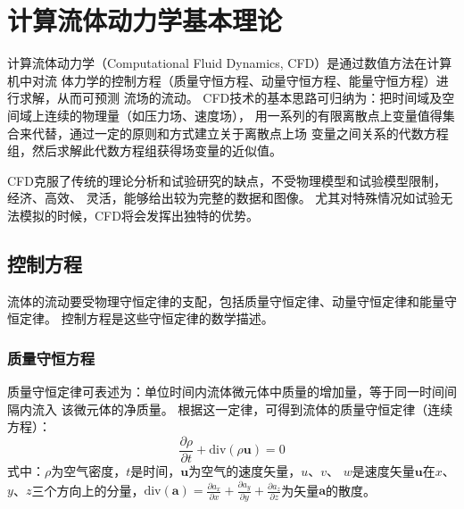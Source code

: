 \section{计算流体动力学基本理论}

计算流体动力学（Computational Fluid Dynamics, CFD）是通过数值方法在计算机中对流
体力学的控制方程（质量守恒方程、动量守恒方程、能量守恒方程）进行求解，从而可预测
流场的流动。
CFD技术的基本思路可归纳为：把时间域及空间域上连续的物理量（如压力场、速度场），
用一系列的有限离散点上变量值得集合来代替，通过一定的原则和方式建立关于离散点上场
变量之间关系的代数方程组，然后求解此代数方程组获得场变量的近似值。

CFD克服了传统的理论分析和试验研究的缺点，不受物理模型和试验模型限制，经济、高效、
灵活，能够给出较为完整的数据和图像。
尤其对特殊情况如试验无法模拟的时候，CFD将会发挥出独特的优势。

\subsection{控制方程}

流体的流动要受物理守恒定律的支配，包括质量守恒定律、动量守恒定律和能量守恒定律。
控制方程是这些守恒定律的数学描述。

\subsubsection{质量守恒方程}
质量守恒定律可表述为：单位时间内流体微元体中质量的增加量，等于同一时间间隔内流入
该微元体的净质量。
根据这一定律，可得到流体的质量守恒定律（连续方程）：
\begin{equation}
  \label{eq:continuity}
  \frac{\partial \rho}{\partial t} + \mathrm{div} (\rho \bm{u}) = 0
\end{equation}
式中：$ \rho $为空气密度，$ t $是时间，$ \bm{u} $为空气的速度矢量，$ u $、$ v $、
$ w $是速度矢量$ \bm{u} $在$ x $、$ y $、$ z $三个方向上的分量，$ \mathrm{div}
(\bm{a}) = \frac{\partial a_x }{\partial x } + \frac{\partial a_y }{\partial y }
+ \frac{\partial a_z  }{\partial z } $为矢量$ \bm{a} $的散度。


